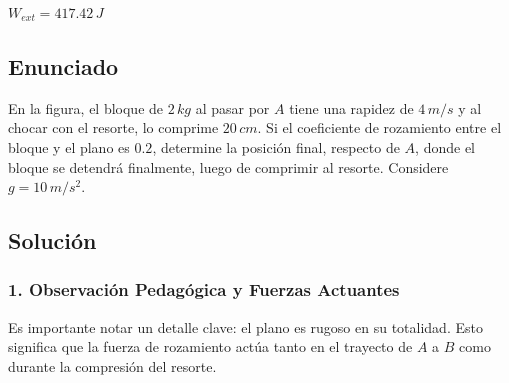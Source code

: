 \documentclass[12pt, a4paper]{article}
\begin{document}
\begin{tcolorbox}[colback=green!5!white, colframe=green!50!black, title=Respuesta Final]
\centering \Large $W_{ext} = 417.42 \, \si{J}$
\end{tcolorbox}

\newpage

\subsection*{Enunciado}
En la figura, el bloque de $2 \, \si{kg}$ al pasar por $A$ tiene una rapidez de $4 \, \si{m/s}$ y al chocar con el resorte, lo comprime $20 \, \si{cm}$. Si el coeficiente de rozamiento entre el bloque y el plano es $0.2$, determine la posición final, respecto de $A$, donde el bloque se detendrá finalmente, luego de comprimir al resorte. Considere $g = 10 \, \si{m/s^2}$.

\begin{center}
\end{center}

\subsection*{Solución}

\subsubsection*{1. Observación Pedagógica y Fuerzas Actuantes}
Es importante notar un detalle clave: el plano es rugoso en su totalidad. Esto significa que la fuerza de rozamiento actúa tanto en el trayecto de $A$ a $B$ como durante la compresión del resorte. 
\end{document}
